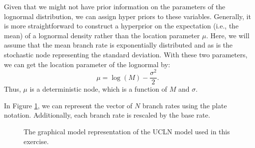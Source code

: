 Given that we might not have prior information on the parameters of the lognormal distribution, we can assign hyper priors to these variables. 
Generally, it is more straightforward to construct a hyperprior on the expectation (i.e., the mean) of a lognormal density rather than the location parameter $\mu$. 
Here, we will assume that the mean branch rate is exponentially distributed and as is the stochastic node representing the standard deviation.
With these two parameters, we can get the location parameter of the lognormal by:
$$\mu = \log(M) - \frac{\sigma^2}{2}.$$
Thus, $\mu$ is a deterministic node, which is a function of $M$ and $\sigma$.

In Figure \ref{m_UCLN:fig}, we can represent the vector of $N$ branch rates using the plate notation. Additionally, each branch rate is rescaled by the base rate. 
\begin{figure}[h!]
\centering
{}
\caption{\small The graphical model representation of the UCLN model used in this exercise.}
\label{m_UCLN:fig}
\end{figure}


%
%
%

